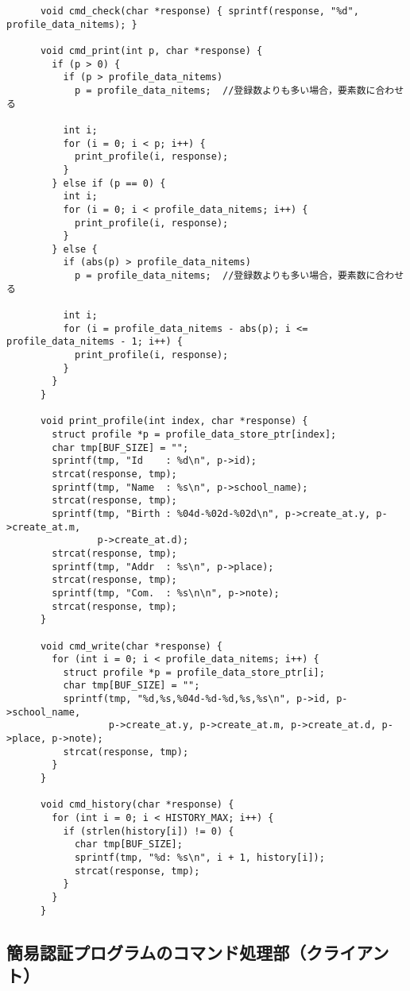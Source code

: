 \documentclass[11pt]{jsarticle}
\begin{document}
\begin{verbatim}
      void cmd_check(char *response) { sprintf(response, "%d", profile_data_nitems); }

      void cmd_print(int p, char *response) {
        if (p > 0) {
          if (p > profile_data_nitems)
            p = profile_data_nitems;  //登録数よりも多い場合，要素数に合わせる
      
          int i;
          for (i = 0; i < p; i++) {
            print_profile(i, response);
          }
        } else if (p == 0) {
          int i;
          for (i = 0; i < profile_data_nitems; i++) {
            print_profile(i, response);
          }
        } else {
          if (abs(p) > profile_data_nitems)
            p = profile_data_nitems;  //登録数よりも多い場合，要素数に合わせる
      
          int i;
          for (i = profile_data_nitems - abs(p); i <= profile_data_nitems - 1; i++) {
            print_profile(i, response);
          }
        }
      }
      
      void print_profile(int index, char *response) {
        struct profile *p = profile_data_store_ptr[index];
        char tmp[BUF_SIZE] = "";
        sprintf(tmp, "Id    : %d\n", p->id);
        strcat(response, tmp);
        sprintf(tmp, "Name  : %s\n", p->school_name);
        strcat(response, tmp);
        sprintf(tmp, "Birth : %04d-%02d-%02d\n", p->create_at.y, p->create_at.m,
                p->create_at.d);
        strcat(response, tmp);
        sprintf(tmp, "Addr  : %s\n", p->place);
        strcat(response, tmp);
        sprintf(tmp, "Com.  : %s\n\n", p->note);
        strcat(response, tmp);
      }
      
      void cmd_write(char *response) {
        for (int i = 0; i < profile_data_nitems; i++) {
          struct profile *p = profile_data_store_ptr[i];
          char tmp[BUF_SIZE] = "";
          sprintf(tmp, "%d,%s,%04d-%d-%d,%s,%s\n", p->id, p->school_name,
                  p->create_at.y, p->create_at.m, p->create_at.d, p->place, p->note);
          strcat(response, tmp);
        }
      }
      
      void cmd_history(char *response) {
        for (int i = 0; i < HISTORY_MAX; i++) {
          if (strlen(history[i]) != 0) {
            char tmp[BUF_SIZE];
            sprintf(tmp, "%d: %s\n", i + 1, history[i]);
            strcat(response, tmp);
          }
        }
      }
\end{verbatim}

\subsection{簡易認証プログラムのコマンド処理部（クライアント）} \label{sec:auth_commands_client.c}
\end{document}
